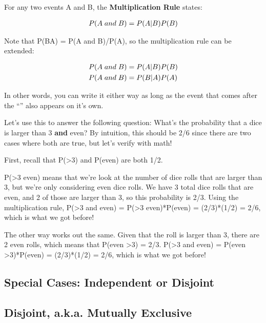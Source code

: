 \documentclass[
  letterpaper,
  DIV=11,
  numbers=noendperiod]{scrreprt}
\begin{document}
For any two events A and B, the \textbf{Multiplication Rule} states:

\begin{align*}
\small P(A\; and\; B) = P(A|B)P(B)
\end{align*}

Note that P(B\textbar A) = P(A and B)/P(A), so the multiplication rule
can be extended:

\begin{align*}
\small P(A\; and\; B) &\small = P(A|B)P(B)\\
\small P(A\; and\; B) &\small = P(B|A)P(A)
\end{align*}

In other words, you can write it either way as long as the event that
comes after the ``\textbar{}'' also appears on it's own.

Let's use this to answer the following question: What's the probability
that a dice is larger than 3 \textbf{and} even? By intuition, this
should be 2/6 since there are two cases where both are true, but let's
verify with math!

First, recall that P(\textgreater3) and P(even) are both 1/2.

P(\textgreater3 \textbar{} even) means that we're look at the number of
dice rolls that are larger than 3, but we're only considering even dice
rolls. We have 3 total dice rolls that are even, and 2 of those are
larger than 3, so this probability is 2/3. Using the multiplication
rule, P(\textgreater3 and even) = P(\textgreater3 \textbar{}
even)*P(even) = (2/3)*(1/2) = 2/6, which is what we got before!

The other way works out the same. Given that the roll is larger than 3,
there are 2 even rolls, which means that P(even \textbar{}
\textgreater3) = 2/3. P(\textgreater3 and even) = P(even \textbar{}
\textgreater3)*P(even) = (2/3)*(1/2) = 2/6, which is what we got before!

\hypertarget{special-cases-independent-or-disjoint}{%
\subsection{Special Cases: Independent or
Disjoint}\label{special-cases-independent-or-disjoint}}

\hypertarget{disjoint-a.k.a.-mutually-exclusive}{%
\subsection{Disjoint, a.k.a. Mutually
Exclusive}\label{disjoint-a.k.a.-mutually-exclusive}}
\end{document}
